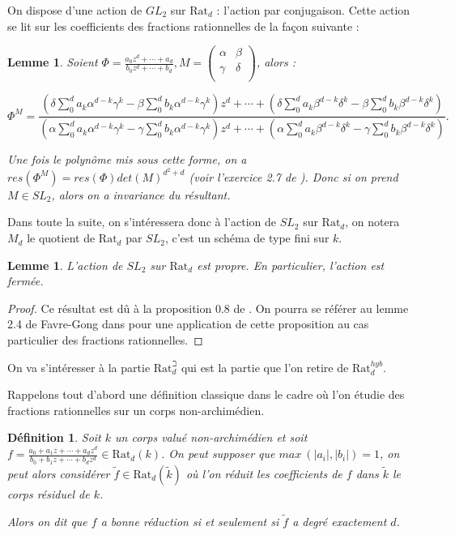 \documentclass[11pt]{article}
\newcommand{\Rat}{\mathrm{Rat}}
\newtheorem{lem}[thm]{Lemme}
\newtheorem{defi}[thm]{Définition}
\begin{document}
On dispose d'une action de $GL_2$ sur $\Rat_d$ : l'action par conjugaison. Cette action se lit sur les coefficients des fractions rationnelles de la façon suivante : 

\begin{lem}\label{invariance du resultant si M est dans SL2}
Soient $ \Phi = \frac{a_0 z^d + \cdots + a_d}{b_0 z^d + \cdots + b_d}, M =  
\begin{pmatrix}
\alpha & \beta\\
\gamma & \delta\\
\end{pmatrix}$, alors :

\begin{equation*}
 \Phi^M = \frac{(\delta \sum_0^d a_k \alpha^{d-k}\gamma^k - \beta \sum_0^d b_k \alpha^{d-k}\gamma^k)z^d + \cdots + (\delta \sum_0^d a_k \beta^{d-k}\delta^k - \beta \sum_0^d b_k \beta^{d-k}\delta^k)}{(\alpha \sum_0^d a_k \alpha^{d-k}\gamma^k - \gamma \sum_0^d b_k \alpha^{d-k}\gamma^k)z^d + \cdots + (\alpha \sum_0^d a_k \beta^{d-k}\delta^k - \gamma \sum_0^d b_k \beta^{d-k}\delta^k)}.
\end{equation*} 

Une fois le polynôme mis sous cette forme, on a $res(\Phi^M) = res (\Phi) det(M)^{d^2+d}$ (voir l'exercice 2.7 de \cite{SilvermanLivre}). Donc si on prend $M \in SL_2$, alors on a invariance du résultant.
\end{lem}

Dans toute la suite, on s'intéressera donc à l'action de $SL_2$ sur $\Rat_d$, on notera $M_d$ le quotient de $\Rat_d$ par $SL_2$, c'est un schéma de type fini sur $k$. 

\begin{lem}
L'action de $SL_2$ sur $\Rat_d$ est propre. En particulier, l'action est fermée. 
\end{lem}
\begin{proof}
Ce résultat est dû à la proposition 0.8 de \cite{GIT}. On pourra se référer au lemme 2.4 de Favre-Gong dans \cite{FavreGong} pour une application de cette proposition au cas particulier des fractions rationnelles.
\end{proof}

On va s'intéresser à la partie $\Rat_d^\beth$ qui est la partie que l'on retire de $\Rat_d^{hyb}$.

Rappelons tout d'abord une définition classique dans le cadre où l'on étudie des fractions rationnelles sur un corps non-archimédien.

\begin{defi}\label{def bonne réduc}
Soit $k$ un corps valué non-archimédien et soit $f = \frac{a_0 + a_1z + \cdots + a_dz^d}{b_0 + b_1z + \cdots + b_dz^d} \in \Rat_d(k)$. On peut supposer que $max~(|a_i|, |b_i|) = 1$, on peut alors considérer $\tilde{f} \in \Rat_d(\tilde{k})$ où l'on réduit les coefficients de $f$ dans $\tilde{k}$ le corps résiduel de $k$.

Alors on dit que $f$ a bonne réduction si et seulement si $\tilde{f}$ a degré exactement $d$. 
\end{defi}
\end{document}
